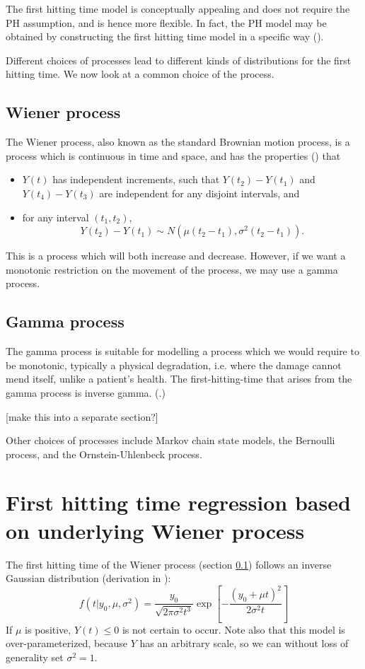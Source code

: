 The first hitting time model is conceptually appealing  and does not require the PH assumption, and is hence more flexible. In fact, the PH model may be obtained by constructing the first hitting time model in a specific way (\cite{lee2010}).

Different choices of processes lead to different kinds of distributions for the first hitting time. We now look at a common choice of the process.

\subsection{Wiener process}\label{sec:wiener}
The Wiener process, also known as the standard Brownian motion process, is a process which is continuous in time and space, and has the properties (\cite[61]{caroni2017}) that
\begin{itemize}
    \item $Y(t)$ has independent increments, such that $Y(t_2)-Y(t_1)$ and $Y(t_4)-Y(t_3)$ are independent for any disjoint intervals, and
    \item for any interval $(t_1, t_2)$,
    \[
        Y(t_2)-Y(t_1)\sim N(\mu(t_2-t_1), \sigma^2(t_2-t_1)).
    \]
\end{itemize}
This is a process which will both increase and decrease. However, if we want a monotonic restriction on the movement of the process, we may use a gamma process.

\subsection{Gamma process}
The gamma process is suitable for modelling a process which we would require to be monotonic, typically a physical degradation, i.e. where the damage cannot mend itself, unlike a patient's health. The first-hitting-time that arises from the gamma process is inverse gamma. (\cite[503]{lee2006}.)

[make this into a separate section?]

Other choices of processes include Markov chain state models, the Bernoulli process, and the Ornstein-Uhlenbeck process.

\section{First hitting time regression based on underlying Wiener process}
The first hitting time of the Wiener process (section \ref{sec:wiener}) follows an inverse Gaussian distribution (derivation in \cite[23-29]{chhikara1988}):
\begin{equation}
\label{eq:fht-ig}
    f(t|y_0,\mu,\sigma^2)=\frac{y_0}{\sqrt{2\pi\sigma^2t^3}}\exp\left[-\frac{(y_0+\mu t)^2}{2\sigma^2t}\right]
\end{equation}
If $\mu$ is positive, $Y(t)\leq 0$ is not certain to occur. Note also that this model is over-parameterized, because $Y$ has an arbitrary scale, so we can without loss of generality set $\sigma^2=1$.

